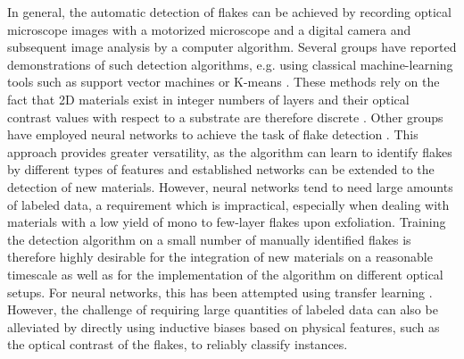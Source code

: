 \documentclass[reprint, prl, superscriptaddress, floatfix]{revtex4-2}
\begin{document}
In general, the automatic detection of flakes can be achieved by recording optical microscope images with a motorized microscope and a digital camera and subsequent image analysis by a computer algorithm. 
Several groups have reported demonstrations of such detection algorithms, e.g. using classical machine-learning tools such as support vector machines or K-means \cite{Masubuchi2018, Lin2018Dec, Li2019Sep}.
These methods rely on the fact that 2D materials exist in integer numbers of layers and their optical contrast values with respect to a substrate are therefore discrete \cite{Blake2007}.
Other groups have employed neural networks to achieve the task of flake detection \cite{Saito2019Dec, Han2020Jul}. 
This approach provides greater versatility, as the algorithm can learn to identify flakes by different types of features and established networks can be extended to the detection of new materials. 
However, neural networks tend to need large amounts of labeled data, a requirement which is impractical, especially when dealing with materials with a low yield of mono to few-layer flakes upon exfoliation.
Training the detection algorithm on a small number of manually identified flakes is therefore highly desirable for the integration of new materials on a reasonable timescale as well as for the implementation of the algorithm on different optical setups.
For neural networks, this has been attempted using transfer learning \cite{Masubuchi2020Mar, Han2020Jul}.
However, the challenge of requiring large quantities of labeled data can also be alleviated by directly using inductive biases based on physical features, such as the optical contrast of the flakes, to reliably classify instances.
\end{document}
